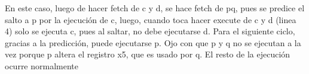 \documentclass[dcc,sol]{fcfmcourse}
\begin{document}
\begin{problems}
\begin{solution}
\begin{enumerate}
        En este caso, luego de hacer fetch de c y d, se hace fetch de pq, pues se predice el salto a p por la ejecución de c, luego, cuando toca hacer execute de c y d (linea 4) solo se ejecuta c, pues al saltar, no debe ejecutarse d. Para el siguiente ciclo, gracias a la predicción, puede ejecutarse p. Ojo con que p y q no se ejecutan a la vez porque p altera el registro x5, que es usado por q. El resto de la ejecución ocurre normalmente
        
    \end{enumerate}
\end{solution}

\end{problems}
\end{document}

